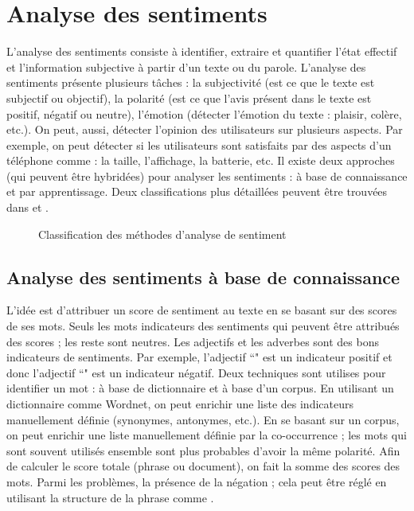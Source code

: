 \documentclass{KodeBook}
\begin{document}
\section{Analyse des sentiments}

L'analyse des sentiments consiste à identifier, extraire et quantifier l'état effectif et l'information subjective à partir d'un texte ou du parole.
L'analyse des sentiments présente plusieurs tâches : la subjectivité (est ce que le texte est subjectif ou objectif), la polarité (est ce que l'avis présent dans le texte est positif, négatif ou neutre), l'émotion (détecter l'émotion du texte : plaisir, colère, etc.). 
On peut, aussi, détecter l'opinion des utilisateurs sur plusieurs aspects. 
Par exemple, on peut détecter si les utilisateurs sont satisfaits par des aspects d'un téléphone comme : la taille, l'affichage, la batterie, etc. 
Il existe deux approches (qui peuvent être hybridées) pour analyser les sentiments : à base de connaissance et par apprentissage. 
Deux classifications plus détaillées peuvent être trouvées dans \cite{19-yue-al} et \cite{14-medhat-al}.

\begin{figure}[!ht]
	\centering
	\caption{Classification des méthodes d'analyse de sentiment}
	\label{fig:asent}
\end{figure}

\subsection{Analyse des sentiments à base de connaissance}

L'idée est d'attribuer un score de sentiment au texte en se basant sur des scores de ses mots. 
Seuls les mots indicateurs des sentiments qui peuvent être attribués des scores ; les reste sont neutres.
Les adjectifs et les adverbes sont des bons indicateurs de sentiments. 
Par exemple, l'adjectif ``" est un indicateur positif et donc l'adjectif ``" est un indicateur négatif.
Deux techniques sont utilises pour identifier un mot : à base de dictionnaire et à base d'un corpus. 
En utilisant un dictionnaire comme Wordnet, on peut enrichir une liste des indicateurs manuellement définie (synonymes, antonymes, etc.).
En se basant sur un corpus, on peut enrichir une liste manuellement définie par la co-occurrence ; les mots qui sont souvent utilisés ensemble sont plus probables d'avoir la même polarité. 
%
Afin de calculer le score totale (phrase ou document), on fait la somme des scores des mots. 
Parmi les problèmes, la présence de la négation ; cela peut être réglé en utilisant la structure de la phrase comme .
\end{document}
